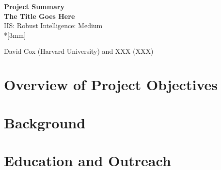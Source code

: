 






\begin{center}
{\Large{\bf Project Summary}}\\
{\bf \large The Title Goes Here
} \\
IIS: Robust Intelligence: Medium
\\*[3mm]

David Cox (Harvard University) and XXX (XXX)

\end{center}




\renewcommand{\thepage} {A--\arabic{page}}

\newpage


\renewcommand{\thepage} {C--\arabic{page}}

\newpage

%
%

\section{Overview of Project Objectives}



\section{Background}



\label{sec:background}


%



\section{Education and Outreach }
\label{sec:edu}


